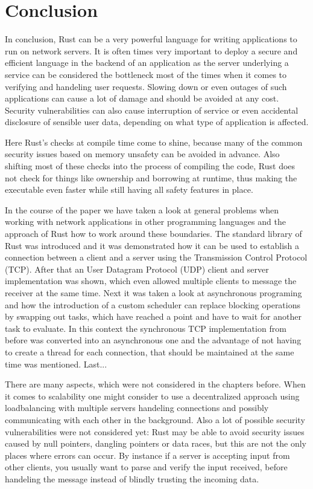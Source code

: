 
\section{Conclusion}
In conclusion, Rust can be a very powerful language for writing applications to run on network servers. It is often
times very important to deploy a secure and efficient language in the backend of an application as the server
underlying a service can be considered the bottleneck most of the times when it comes to verifying and handeling user
requests. Slowing down or even outages of such applications can cause a lot of damage and should be avoided at any
cost. Security vulnerabilities can also cause interruption of service or even accidental disclosure of sensible user
data, depending on what type of application is affected.

Here Rust's checks at compile time come to shine, because many of the common security issues based on memory unsafety
can be avoided in advance. Also shifting most of these checks into the process of compiling the code, Rust does not
check for things like ownership and borrowing at runtime, thus making the executable even faster while still having
all safety features in place.

In the course of the paper we have taken a look at general problems when working with network applications in other
programming languages and the approach of Rust how to work around these boundaries. The standard library of Rust was
introduced and it was demonstrated how it can be used to establish a connection between a client and a server using the
Transmission Control Protocol (TCP). After that an User Datagram Protocol (UDP) client and server implementation was
shown, which even allowed multiple clients to message the receiver at the same time. Next it was taken a look at
asynchronous programing and how the introduction of a custom scheduler can replace blocking operations by swapping
out tasks, which have reached a  point and have to wait for another task to evaluate. In this context the
synchronous TCP implementation from before was converted into an asynchronous one and the advantage of not having to
create a thread for each connection, that should be maintained at the same time was mentioned. Last...

There are many aspects, which were not considered in the chapters before. When it comes to scalability one might
consider to use a decentralized approach using loadbalancing with multiple servers handeling connections and possibly
communicating with each other in the background. Also a lot of possible security vulnerabilities were not considered
yet: Rust may be able to avoid security issues caused by null pointers, dangling pointers or data races, but this are
not the only places where errors can occur. By instance if a server is accepting input from other clients, you usually
want to parse and verify the input received, before handeling the message instead of blindly trusting the incoming
data.

